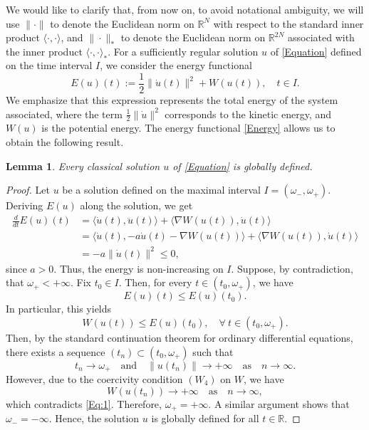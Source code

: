 \documentclass[12pt]{amsart}
\numberwithin{equation}{section}
\newtheorem{lemma}[theorem]{Lemma}
\begin{document}
We would like to clarify that, from now on, to avoid notational ambiguity, we will use $\|\cdot\|$ to denote the Euclidean norm on $\mathbb{R}^N$ with respect to the standard inner product $\langle \cdot, \cdot \rangle$, and $\|\cdot\|_*$ to denote the Euclidean norm on $\mathbb{R}^{2N}$ associated with the inner product $\langle \cdot, \cdot \rangle_*$. For a sufficiently regular solution $u$ of \eqref{Equation} defined on the time interval $I$, we consider the energy functional
\begin{equation}\label{Energy}
	E(u)(t) := \frac{1}{2} \|\dot{u}(t)\|^2 + W(u(t)),\quad t\in I.
\end{equation}
We emphasize that this expression represents the total energy of the system associated, where the term $\frac{1}{2} \|\dot{u}\|^2$ corresponds to the kinetic energy, and $W(u)$ is the potential energy. The energy functional \eqref{Energy} allows us to obtain the following result.

\begin{lemma}\label{L1}
	Every classical solution $u$ of \eqref{Equation} is globally defined.
\end{lemma}
\begin{proof}
Let $u$ be a solution defined on the maximal interval $I = (\omega_-, \omega_+)$. Deriving $E(u)$ along the solution, we get
\begin{align*}
	\frac{d}{dt}E(u)(t) &= \langle \dot{u}(t), \ddot{u}(t) \rangle + \langle \nabla W(u(t)), \dot{u}(t) \rangle \\
	&= \langle \dot{u}(t), -a \dot{u}(t) - \nabla W(u(t)) \rangle + \langle \nabla W(u(t)), \dot{u}(t) \rangle \\
	&= -a \|\dot{u}(t)\|^2 \leq 0,
\end{align*}
since $a>0$. Thus, the energy is non-increasing on $I$. Suppose, by contradiction, that $\omega_{+} < +\infty$. Fix $t_{0} \in I$. Then, for every  $t \in (t_{0},\omega_{+})$, we have
$$
E(u)(t) \leq E(u)(t_{0}).
$$
In particular, this yields
\begin{equation}\label{Eq:1}
	 W(u(t)) \leq E(u)(t_0), \quad \forall ~t \in (t_0,\omega_+).
\end{equation}
Then, by the standard continuation theorem for ordinary differential equations, there exists a sequence $(t_n) \subset (t_0,\omega_+)$ such that 
$$
t_n \to \omega_+\quad\text{and}\quad \|u(t_n)\| \to +\infty\quad\text{as}\quad n \to \infty.
$$ 
However, due to the coercivity condition \hyperlink{W4}{$(W_4)$} on $W$, we have 
$$
W(u(t_n)) \to +\infty\quad\text{as}\quad n \to \infty,
$$ 
which contradicts \eqref{Eq:1}. Therefore, $\omega_+ = +\infty$. A similar argument shows that $\omega_- = -\infty$. Hence, the solution $u$ is globally defined for all $t \in \mathbb{R}$.
\end{proof}
\end{document}
